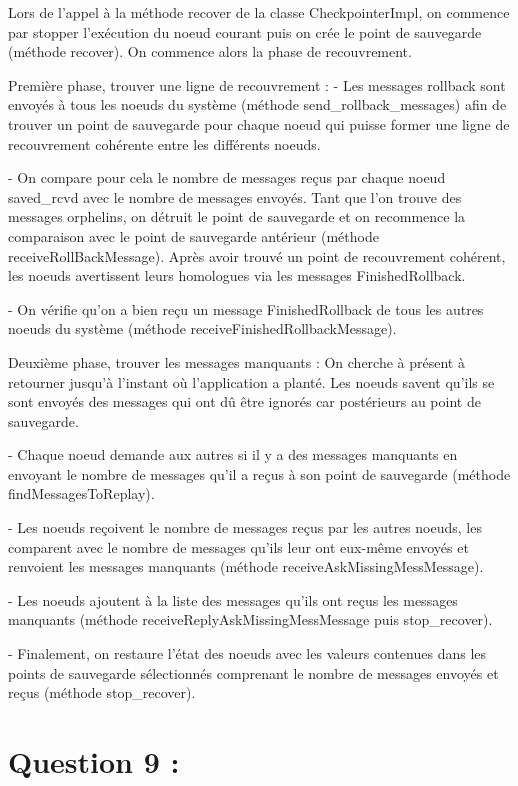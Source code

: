 \documentclass[11pt,a4paper]{report}
\begin{document}
Lors de l'appel à la méthode recover de la classe CheckpointerImpl, on commence par stopper l'exécution du noeud courant puis on crée le point de sauvegarde (méthode recover). On commence alors la phase de recouvrement.


Première phase, trouver une ligne de recouvrement :
- Les messages rollback sont envoyés à tous les noeuds du système (méthode send_rollback_messages) afin de trouver un point de sauvegarde pour chaque noeud qui puisse former une ligne de recouvrement cohérente entre les différents noeuds.

- On compare pour cela le nombre de messages reçus par chaque noeud saved_rcvd avec le nombre de messages envoyés. Tant que l'on trouve des messages orphelins, on détruit le point de sauvegarde et on recommence la comparaison avec le point de sauvegarde antérieur (méthode receiveRollBackMessage). Après avoir trouvé un point de recouvrement cohérent, les noeuds avertissent leurs homologues via les messages FinishedRollback.

- On vérifie qu'on a bien reçu un message FinishedRollback de tous les autres noeuds du système (méthode receiveFinishedRollbackMessage).


Deuxième phase, trouver les messages manquants :
On cherche à présent à retourner jusqu'à l'instant où l'application a planté. Les noeuds savent qu'ils se sont envoyés des messages qui ont dû être ignorés car postérieurs au point de sauvegarde.

- Chaque noeud demande aux autres si il y a des messages manquants en envoyant le nombre de messages qu'il a reçus à son point de sauvegarde (méthode findMessagesToReplay).

- Les noeuds reçoivent le nombre de messages reçus par les autres noeuds, les comparent avec le nombre de messages qu'ils leur ont eux-même envoyés et renvoient les messages manquants (méthode receiveAskMissingMessMessage).

- Les noeuds ajoutent à la liste des messages qu'ils ont reçus les messages manquants (méthode receiveReplyAskMissingMessMessage puis stop_recover).

- Finalement, on restaure l'état des noeuds avec les valeurs contenues dans les points de sauvegarde sélectionnés comprenant le nombre de messages envoyés et reçus (méthode stop_recover).


\section{Question 9 :}
\end{document}
